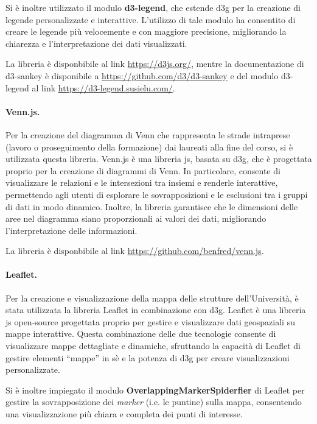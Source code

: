 Si è inoltre utilizzato il modulo \textbf{d3-legend}, che estende \gls{d3g} per la creazione di legende personalizzate e interattive. L'utilizzo di tale modulo ha 
consentito di creare le legende più velocemente e con maggiore precisione, migliorando la chiarezza e l'interpretazione dei dati visualizzati. 

La libreria è disponbibile al link \href{https://d3js.org/}{https://d3js.org/}, mentre la documentazione di d3-sankey è disponibile a \href{https://github.com/d3/d3-sankey}{https://github.com/d3/d3-sankey} e del modulo d3-legend 
al link \href{https://d3-legend.susielu.com/}{https://d3-legend.susielu.com/}.

\paragraph{Venn.js.} 
Per la creazione del diagramma di Venn che rappresenta le strade intraprese (lavoro o proseguimento della formazione) dai laureati alla fine del corso, si è utilizzata questa libreria.
Venn.js è una libreria \gls{js}, basata su \gls{d3g}, che è progettata proprio per la creazione di diagrammi di Venn. 
In particolare, consente di visualizzare le relazioni e le intersezioni tra insiemi e renderle interattive, permettendo agli utenti di esplorare le sovrapposizioni e le esclusioni tra i gruppi di dati in modo dinamico. 
Inoltre, la libreria garantisce che le dimensioni delle aree nel diagramma siano proporzionali ai valori dei dati, migliorando l'interpretazione delle informazioni. 

La libreria è disponbibile al link \href{https://github.com/benfred/venn.js}{https://github.com/benfred/venn.js}.

\paragraph{Leaflet.} 
Per la creazione e visualizzazione della mappa delle strutture dell'Università, è stata utilizzata la libreria Leaflet in combinazione con \gls{d3g}. 
Leaflet è una libreria \gls{js} open-source progettata proprio per gestire e visualizzare dati geospaziali su mappe interattive.
Questa combinazione delle due tecnologie consente di visualizzare mappe dettagliate e dinamiche, sfruttando la capacità di Leaflet di gestire elementi ``mappe'' in sè
e la potenza di \gls{d3g} per creare visualizzazioni personalizzate.

Si è inoltre impiegato il modulo \textbf{OverlappingMarkerSpiderfier} di Leaflet per gestire la sovrapposizione dei \emph{marker} (i.e. le puntine) sulla mappa, consentendo 
una visualizzazione più chiara e completa dei punti di interesse.

